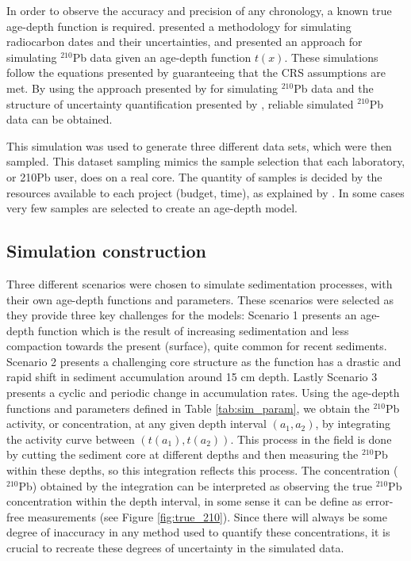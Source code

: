\documentclass [10pt] {article}
\begin{document}
	In order to observe the accuracy and precision of any chronology, a known true age-depth function is required.
\citet{Blaauw2018} presented a methodology for simulating radiocarbon dates and their uncertainties, and \citet{Aquino2018} presented an approach for simulating $^{210}$Pb data given an age-depth function $t(x)$.
These simulations follow the equations presented by \cite{Appleby1978, Robbins1978} guaranteeing that the CRS assumptions are met. 
By using the approach presented by \citet{Aquino2018} for simulating $^{210}$Pb data and the structure of uncertainty quantification presented by \citet{Blaauw2018}, reliable simulated $^{210}$Pb data can be obtained.

	This simulation was used to generate three different data sets, which were then sampled. 
This dataset sampling mimics the sample selection that each laboratory, or 210Pb user, does on a real core.
The quantity of samples is decided by the resources available to each project (budget, time), as explained by \citet{Blaauw2018}. 
In some cases very few samples are selected to create an age-depth model.

\subsection{Simulation construction}\label{sec:SimConst}

Three different scenarios were chosen to simulate sedimentation processes, with their own age-depth functions and parameters. 
These scenarios were selected as they provide three key challenges for the models: 
Scenario 1 presents an age-depth function which is the result of increasing sedimentation and less compaction towards the present (surface), quite common for recent sediments. 
Scenario 2 presents a challenging core structure as the function has a drastic and rapid shift in sediment accumulation around 15 cm depth. 
Lastly Scenario 3 presents a cyclic and periodic change in accumulation rates. 
Using the age-depth functions and parameters defined in Table \ref{tab:sim_param}, we obtain the $^{210}$Pb activity, or concentration, at any given depth interval $(a_1,a_2)$, by integrating the activity curve between $(t(a_1),t(a_2))$.  
This process in the field is done by cutting the sediment core at different depths and then measuring the $^{210}$Pb within these depths, so this integration reflects this process.
The concentration ($^{210}$Pb) obtained by the integration can be interpreted as observing the true $^{210}$Pb concentration within the depth interval, in some sense it can be define as error-free measurements  (see Figure \ref{fig:true_210}).
Since there will always be some degree of inaccuracy in any method used to quantify these concentrations, it is crucial to recreate these degrees of uncertainty in the simulated data.
\end{document}
